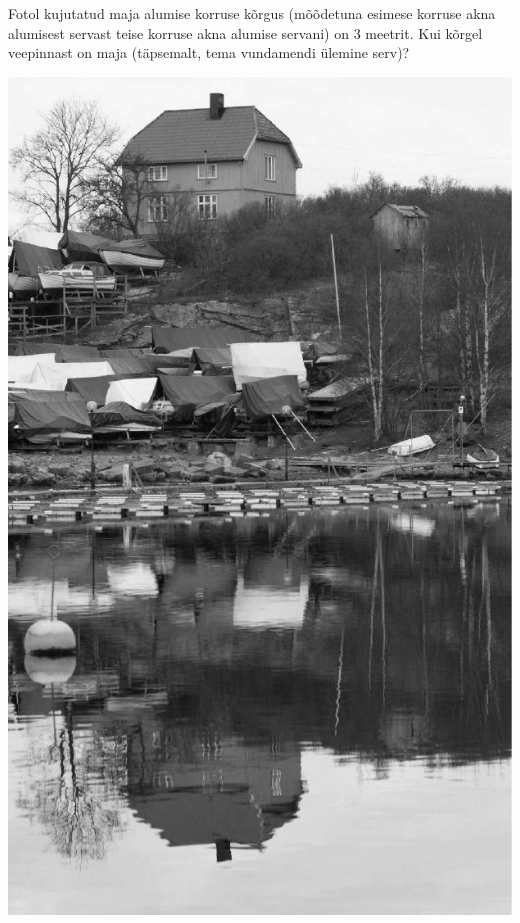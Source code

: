 \documentclass[10pt, twoside]{article}
\begin{document}
{%

Fotol kujutatud maja alumise korruse kõrgus (mõõdetuna esimese korruse akna alumisest servast teise korruse akna alumise servani) on 3 meetrit. Kui kõrgel veepinnast on maja (täpsemalt, tema vundamendi ülemine serv)?

\begin{center}
	\includegraphics[height=\textheight]{2008-v3g-04-yl}
\end{center}
\probend
\bigskip

}
\end{document}
